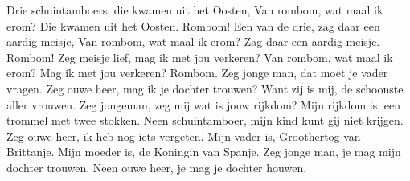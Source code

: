 \beginverse
Drie schuintamboers, die kwamen uit het Oosten, 
Van rombom, wat maal ik erom?
Die kwamen uit het Oosten.
Rombom!
\endverse
\beginverse
Een van de drie, zag daar een aardig meisje, 
Van rombom, wat maal ik erom?
Zag daar een aardig meisje.
Rombom!
\endverse
\beginverse
Zeg meisje lief, mag ik met jou verkeren? 
Van rombom, wat maal ik erom?
Mag ik met jou verkeren?
Rombom.
\endverse
\beginverse
Zeg jonge man, dat moet je vader vragen.
\endverse
\beginverse
Zeg ouwe heer, mag ik je dochter trouwen?
\endverse
\beginverse
Want zij is mij, de schoonste aller vrouwen.
\endverse
\beginverse
Zeg jongeman, zeg mij wat is jouw rijkdom?
\endverse
\beginverse
Mijn rijkdom is, een trommel met twee stokken.
\endverse
\beginverse
Neen schuintamboer, mijn kind kunt gij niet krijgen.
\endverse
\beginverse
Zeg ouwe heer, ik heb nog iets vergeten.
\endverse
\beginverse
Mijn vader is, Groothertog van Brittanje.
\endverse
\beginverse
Mijn moeder is, de Koningin van Spanje.
\endverse
\beginverse
Zeg jonge man, je mag mijn dochter trouwen.
\endverse
\beginverse
Neen ouwe heer, je mag je dochter houwen.
\endverse
\endsong